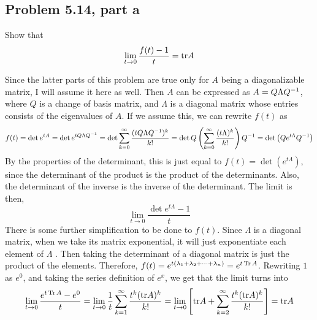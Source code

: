 \subsection{Problem 5.14, part a}
Show that
\[\lim_{t \rightarrow 0} \frac{f(t) - 1}{t} = \text{tr} A\]
\partbreak
\begin{solution}

    Since the latter parts of this problem are true only for $A$ being a diagonalizable matrix, I will assume it here as well. Then $A$ can be expressed as $A = Q\Lambda Q^{-1} $, where $Q$ is a change of basis matrix, and $\Lambda$ is a diagonal matrix whose entries consists of the eigenvalues of $A$. If we assume this, we can rewrite $f(t)$ as
    \[f(t) = \det e^{tA} = \det e^{tQ\Lambda Q^{-1}} = \det \sum_{k = 0}^\infty \frac{(tQ\Lambda Q^{-1} )^k}{k!} = \det Q\left(\sum_{k = 0}^\infty \frac{(t\Lambda)^k}{k!}\right) Q^{-1} = \det \left( Qe^{t\Lambda}Q^{-1} \right)\]
    By the properties of the determinant, this is just equal to $f(t) = \det \left( e^{t\Lambda}\right)$, since the determinant of the product is the product of the determinants. Also, the determinant of the inverse is the inverse of the determinant. The limit is then,
    \[\lim_{t \rightarrow 0} \frac{\det e^{t\Lambda} - 1}{t}\]
    There is some further simplification to be done to $f(t)$. Since $\Lambda$ is a diagonal matrix, when we take its matrix exponential, it will just exponentiate  each element of $\Lambda$ . Then taking the determinant of a diagonal matrix is just the product of the elements. Therefore, $f(t) = e^{t(\mathrm{\lambda}_1 + \mathrm{\lambda}_2 + \dots + \mathrm{\lambda}_n)} = e^{t\Tr A}$. Rewriting $1$ as $e^0$, and taking the series definition of $e^x$, we get that the limit turns into
    \[\lim_{t\rightarrow 0}\frac{e^{t\Tr A} - e^0}{t} = \lim_{t\rightarrow 0}\frac{1}{t} \sum_{k = 1}^\infty \frac{t^k (\text{tr} A)^k}{k!} = \lim_{t\rightarrow 0} \left [\text{tr} A + \sum_{k = 2}^\infty \frac{t^k (\text{tr} A)^k}{k!}\right ] = \text{tr} A\]

\end{solution}
\newpage
